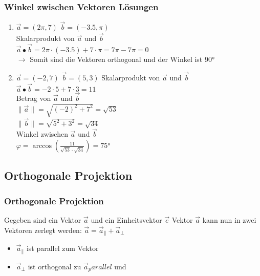 \begin{frame}
    \frametitle{Winkel zwischen Vektoren Lösungen}
    \begin{enumerate}
        \item $\vec{a} = (2\pi, 7)$ $\vec{b} = (-3.5, \pi)$ \\
        Skalarprodukt von $\vec{a}$ und $\vec{b}$ \\
        $\vec{a} \bullet \vec{b} = 2\pi \cdot (-3.5) + 7 \cdot \pi = 7\pi - 7\pi = 0$ \\
        $\rightarrow$ Somit sind die Vektoren orthogonal und der Winkel ist 90° \\
        $ $ \\
        \item $\vec{a} = (-2, 7)$ $\vec{b} = (5, 3)$
        Skalarprodukt von $\vec{a}$ und $\vec{b}$ \\
        $\vec{a} \bullet \vec{b} = -2 \cdot 5 + 7 \cdot 3 = 11$ \\
        Betrag von $\vec{a}$ und $\vec{b}$ \\
        $\lVert \vec{a} \rVert = \sqrt{(-2)^2 + 7^2} = \sqrt{53}$ \\
        $\lVert \vec{b} \rVert = \sqrt{5^2 + 3^2} = \sqrt{34}$ \\
        Winkel zwischen $\vec{a}$ und $\vec{b}$ \\
        $\varphi = \arccos(\frac{11}{\sqrt{53} \cdot \sqrt{34}}) = 75$°
    \end{enumerate}
\end{frame}

\subsection{Orthogonale Projektion}
\begin{frame}
    \frametitle{Orthogonale Projektion}
    \vfill Gegeben sind ein Vektor $\vec{a}$ und ein Einheitsvektor $\vec{e}$
    \vfill Vektor $\vec{a}$ kann nun in zwei Vektoren zerlegt werden:
    \vfill $\vec{a} = \vec{a}_{\parallel} + \vec{a}_{\perp}$
    \vfill \begin{itemize}
        \item $\vec{a}_{\parallel}$ ist parallel zum Vektor 
        \item $\vec{a}_{\perp}$ ist orthogonal zu $\vec{a}_parallel$ und 
    \end{itemize}
\end{frame}

